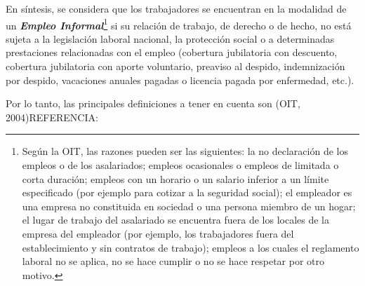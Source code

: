 \documentclass[
  openany]{book}
\begin{document}
En síntesis, se considera que los trabajadores se encuentran en la modalidad de un \textbf{\emph{Empleo Informal}}\footnote{Según la OIT, las razones pueden ser las siguientes: la no declaración de los empleos o de los asalariados; empleos ocasionales o empleos de limitada o corta duración; empleos con un horario o un salario inferior a un límite especificado (por ejemplo para cotizar a la seguridad social); el empleador es una empresa no constituida en sociedad o una persona miembro de un hogar; el lugar de trabajo del asalariado se encuentra fuera de los locales de la empresa del empleador (por ejemplo, los trabajadores fuera del establecimiento y sin contratos de trabajo); empleos a los cuales el reglamento laboral no se aplica, no se hace cumplir o no se hace respetar por otro motivo.} si su relación de trabajo, de derecho o de hecho, no está sujeta a la legislación laboral nacional, la protección social o a determinadas prestaciones relacionadas con el empleo (cobertura jubilatoria con descuento, cobertura jubilatoria con aporte voluntario, preaviso al despido, indemnización por despido, vacaciones anuales pagadas o licencia pagada por enfermedad, etc.).

Por lo tanto, las principales definiciones a tener en cuenta son (OIT, 2004)REFERENCIA:
\end{document}
